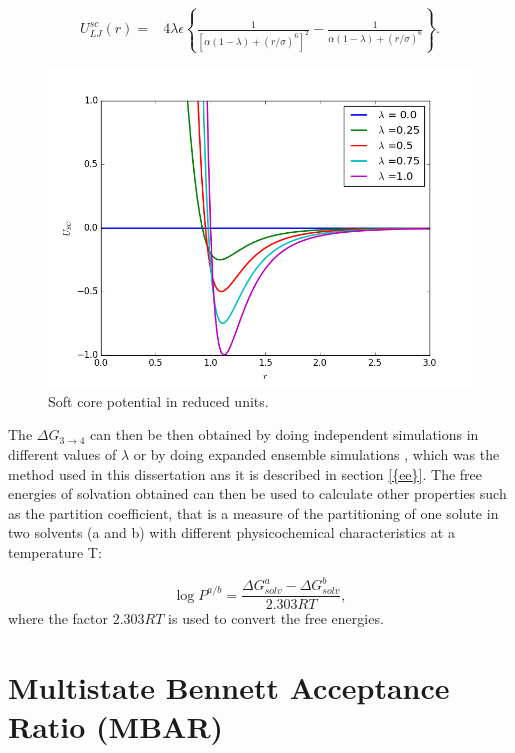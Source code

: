 	\begin{equation}
	\label{eq:softcoreLJ}
	\begin{aligned}
	U_{LJ}^{sc}(r) {}=& 4\lambda\epsilon \left\lbrace\frac{1}{\left[\alpha(1-\lambda)+ (r/\sigma)^{6}\right]^{2}} - \frac{1}{\alpha(1-\lambda)+(r/\sigma)^{6}}\right\rbrace .
	\end{aligned}
	\end{equation}
	
	\begin{figure}[H]
		\centering
		\includegraphics[width=0.9\linewidth]{Figures/SC}
		\caption{Soft core potential in reduced units.}
		\label{fig:SC}
	\end{figure}
	
	The $\Delta G_{3 \rightarrow 4}$ can then be then obtained by doing independent simulations in different values of $\lambda$ or by doing expanded ensemble simulations \cite{lyubartsev}, which was the method used in this dissertation ans it is described in section \ref{{ee}}. The free energies of solvation obtained can then be used to calculate other properties such as the partition coefficient, that is a measure of the partitioning of one solute in two solvents (a and b) with different physicochemical characteristics  at a temperature T:
	
	\begin{equation}
	\label{eqn:partcoe}
	\log{P}^{a/b} = \frac{\Delta G_{solv}^{a} - \Delta G_{solv}^{b}}{2.303RT},
	\end{equation}
	where the factor $2.303RT$ is used to convert the free energies.
	
	
\section{Multistate Bennett Acceptance Ratio (MBAR)}\label{mbar}
	
